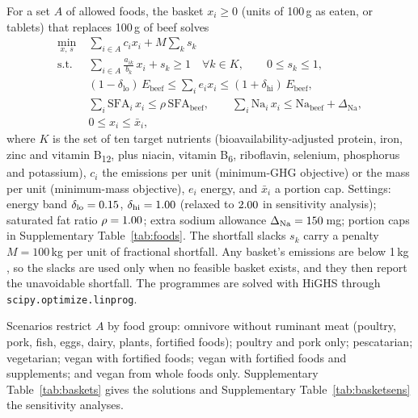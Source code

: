 \documentclass[10pt]{article}
\begin{document}
For a set $A$ of allowed foods, the basket $x_i\ge 0$ (units of 100\,g as eaten, or
tablets) that replaces 100\,g of beef solves
\begin{align}
\min_{x,\,s}\;& \sum_{i\in A} c_i x_i + M\sum_{k} s_k \\
\text{s.t.}\;& \sum_{i\in A} \frac{a_{ik}}{b_k}\,x_i + s_k \ge 1 \quad \forall k \in K, \qquad 0\le s_k\le 1,\\
& (1-\delta_{\mathrm{lo}})\,E_{\mathrm{beef}} \le \sum_i e_i x_i \le (1+\delta_{\mathrm{hi}})\,E_{\mathrm{beef}},\\
& \sum_i \mathrm{SFA}_i\, x_i \le \rho\,\mathrm{SFA}_{\mathrm{beef}}, \qquad
\sum_i \mathrm{Na}_i\, x_i \le \mathrm{Na}_{\mathrm{beef}} + \Delta_{\mathrm{Na}},\\
& 0 \le x_i \le \bar{x}_i ,
\end{align}
where $K$ is the set of ten target nutrients (bioavailability-adjusted protein,
iron, zinc and vitamin B\textsubscript{12}, plus niacin, vitamin B\textsubscript{6},
riboflavin, selenium, phosphorus and potassium), $c_i$ the emissions per unit
(minimum-GHG objective) or the mass per unit (minimum-mass objective), $e_i$
energy, and $\bar{x}_i$ a portion cap. Settings: energy band
$\delta_{\mathrm{lo}}=0.15$, $\delta_{\mathrm{hi}}=1.00$
(relaxed to $2.00$ in sensitivity analysis); saturated fat ratio
$\rho=1.00$; extra sodium allowance $\Delta_{\mathrm{Na}}=150$\,mg;
portion caps in Supplementary Table~\ref{tab:foods}. The shortfall slacks $s_k$ carry a penalty
$M=100$\,kg \COtwoe{} per unit of fractional shortfall. Any basket's emissions are
below 1\,kg \COtwoe{}, so the slacks are used only when no feasible basket
exists, and they then report the unavoidable shortfall. The programmes are
solved with HiGHS through \texttt{scipy.optimize.linprog}.

Scenarios restrict $A$ by food group: omnivore without ruminant meat
(poultry, pork, fish, eggs, dairy, plants, fortified foods); poultry and pork only;
pescatarian; vegetarian; vegan with fortified foods; vegan with fortified foods
and supplements; and vegan from whole foods only. Supplementary Table~\ref{tab:baskets}
gives the solutions and Supplementary Table~\ref{tab:basketsens} the sensitivity analyses.

\begin{table}[p]
\centering\scriptsize
\caption{\textbf{Optimised baskets replacing 100\,g of cooked beef.} Composition in g as
eaten (supplements in tablets), emissions with central emission factors, and
the supply of each target nutrient relative to beef (1.00 = equal).}
\label{tab:baskets}
\resizebox{\linewidth}{!}{}
\end{table}
\end{document}
